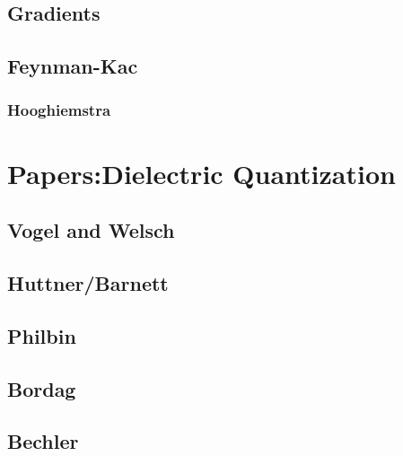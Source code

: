\subsection{Gradients}

\subsection{Feynman-Kac}

\subsubsection{Hooghiemstra}



\section{Papers:Dielectric Quantization}



\subsection{Vogel and Welsch}


\cite{Raabe2006}
\cite{Raabe2007}

\subsection{Huttner/Barnett}

\cite{Glauber1991}

\cite{Huttner1992}

\cite{Matloob1995}
\cite{Matloob1996}


\subsection{Philbin}

\cite{Philbin2010}
\cite{Philbin2011}

\cite{Drummond2014}

\subsection{Bordag}
\cite{Bordag1998} \cite{Bordag1999}

\subsection{Bechler}


